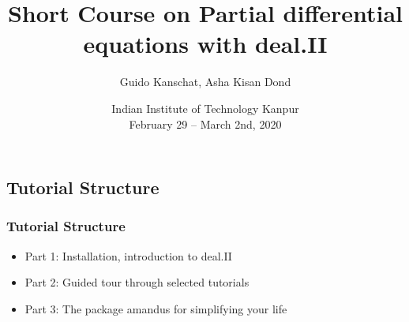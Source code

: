 \documentclass[aspectratio=43]{beamer}
\date[IITK 2020]{Indian Institute of Technology Kanpur\\
  February 29 -- March 2nd, 2020}
\title[deal.II Course]{Short Course on Partial differential equations with deal.II}
\author[Kanschat/Dond]{Guido Kanschat, Asha Kisan Dond}
\institute[IWR HD \& IISER TVM]{IWR, Universität Heidelberg
and IISER Thiruvananthapuram
  \\[2mm]
\texttt{[image: iwr]}
\hfill
\texttt{[image: dealclover]}
\hfill
\texttt{[image: unihd]}
\hfill
\texttt{[image: iiserlogo]}
}
\begin{document}
\begin{frame}[plain]
  \titlepage    
\end{frame}

\subsection*{Tutorial Structure}
\begin{frame}
  \frametitle{Tutorial Structure}
  \begin{itemize}
  \item Part 1: Installation, introduction to deal.II
  \item Part 2: Guided tour through selected tutorials
  \item Part 3: The package amandus for simplifying your life
  \end{itemize}
\end{frame}



%
\end{document}
